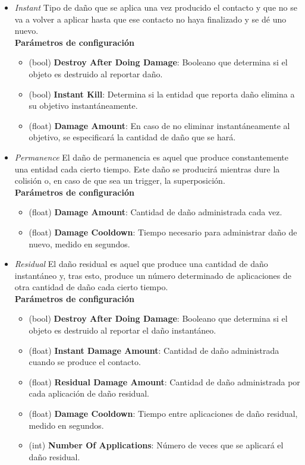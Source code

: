 \begin{itemize}
	\item \textit{Instant}
Tipo de daño que se aplica una vez producido el contacto y que no se va a volver a aplicar hasta que ese contacto no haya finalizado y se dé uno nuevo.\\

\textbf{Parámetros de configuración}
	\begin{itemize}
	        \item (bool) \textbf{Destroy After Doing Damage}: Booleano que determina si el objeto es destruido al reportar daño.
	        \item (bool) \textbf{Instant Kill}: Determina si la entidad que reporta daño elimina a su objetivo instantáneamente.
	        \item (float) \textbf{Damage Amount}: En caso de no eliminar instantáneamente al objetivo, se especificará la cantidad de daño que se hará.
	 \end{itemize}
	\item \textit{Permanence}
El daño de permanencia es aquel que produce constantemente una entidad cada cierto tiempo. Este daño se producirá mientras dure la colisión o, en caso de que sea un trigger, la superposición.\\

\textbf{Parámetros de configuración}
	\begin{itemize}
	        \item (float) \textbf{Damage Amount}: Cantidad de daño administrada cada vez.
	        \item (float) \textbf{Damage Cooldown}: Tiempo necesario para administrar daño de nuevo, medido en segundos.
	\end{itemize}

	\item \textit{Residual}
El daño residual es aquel que produce una cantidad de daño instantáneo y, tras esto, produce un número determinado de aplicaciones de otra cantidad de daño cada cierto tiempo.\\

\textbf{Parámetros de configuración}
	\begin{itemize}
	        \item (bool) \textbf{Destroy After Doing Damage}: Booleano que determina si el objeto es destruido al reportar el daño instantáneo.
	        \item (float) \textbf{Instant Damage Amount}: Cantidad de daño administrada cuando se produce el contacto.
	        \item (float) \textbf{Residual Damage Amount}: Cantidad de daño administrada por cada aplicación de daño residual.
	        \item (float) \textbf{Damage Cooldown}: Tiempo entre aplicaciones de daño residual, medido en segundos.
	        \item (int) \textbf{Number Of Applications}: Número de veces que se aplicará el daño residual.
	\end{itemize}
\end{itemize}

